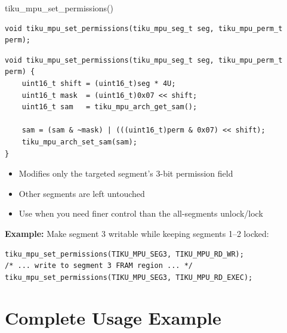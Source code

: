 \documentclass[aspectratio=169, 10pt]{beamer}
\begin{document}
\begin{frame}[fragile]{tiku\_mpu\_set\_permissions()}
\begin{lstlisting}[style=cstyle]
void tiku_mpu_set_permissions(tiku_mpu_seg_t seg, tiku_mpu_perm_t perm);
\end{lstlisting}

\begin{lstlisting}[style=cstyle, title={kernel/memory/tiku\_mpu.c}]
void tiku_mpu_set_permissions(tiku_mpu_seg_t seg, tiku_mpu_perm_t perm) {
    uint16_t shift = (uint16_t)seg * 4U;
    uint16_t mask  = (uint16_t)0x07 << shift;
    uint16_t sam   = tiku_mpu_arch_get_sam();

    sam = (sam & ~mask) | (((uint16_t)perm & 0x07) << shift);
    tiku_mpu_arch_set_sam(sam);
}
\end{lstlisting}

\vspace{0.3em}
\begin{itemize}
  \item Modifies only the targeted segment's 3-bit permission field
  \item Other segments are left untouched
  \item Use when you need finer control than the all-segments unlock/lock
\end{itemize}

\vspace{0.3em}
\textbf{Example:} Make segment 3 writable while keeping segments 1--2 locked:
\begin{lstlisting}[style=cstyle]
tiku_mpu_set_permissions(TIKU_MPU_SEG3, TIKU_MPU_RD_WR);
/* ... write to segment 3 FRAM region ... */
tiku_mpu_set_permissions(TIKU_MPU_SEG3, TIKU_MPU_RD_EXEC);
\end{lstlisting}
\end{frame}

\section{Complete Usage Example}
\end{document}
